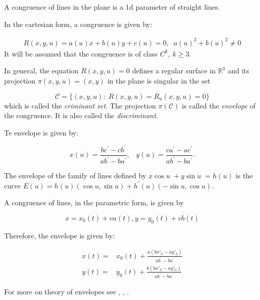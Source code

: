 

\begin{definition}
A congruence of lines in the plane is a 1d parameter of straight lines.
\end{definition}

 
   In the cartesian form, a congruence is given by:
 

\begin{align}  R(x,y,u)=a(u)x+b(u)y+c(u)=0,\;\; a(u)^2+b(u)^2\ne  0
\label{eq:appB-cr}
\end{align}
It will be assumed that the congruence is of class  $C^k,\, k\geq 3$. 

In general, the equation   $R(x,y,u)=0$ defines a regular surface in   $\mathbb{R}^3$  and its projection   $\pi(x,y,u)=(x,y)$ in the plane is singular in the set  

  \[\mathcal{C}= \{(x,y,u): \; R(x,y,u)=  R_u(x,y,u) =0 \} \]
  which is called the   \textit{criminant set}.
  The projection $\pi(\mathcal{C})$ is called the \textit{envelope} of the congruence. It is also called the     \textit{  discriminant.}

Te envelope is given by:

\begin{equation}\label{eq:env}
x(u)=\frac{b c^\prime-c b^\prime}{a b^\prime-b a^\prime},\;\;\; y(u)=\frac{c a^\prime-a c^\prime}{a b^\prime-b a^\prime}.
\end{equation}

 

\begin{example}  The envelope of the family of lines defined by   $x \cos u\;  +y\sin u \;  =h(u)$ is the curve
	$E(u)=h(u)(\cos u,\sin u)	+h^\prime(u)(-\sin u, \cos u). $
\end{example}

 
A congruence of lines, in the parametric form, is given by
 
\[ x=x_0(t)+v a(t), y=y_0(t)+v b(t)\]

Therefore, the envelope is given by:
 
	
	\begin{align*}
  x(t)=&x_0(t)+\frac{   a( b x'_0-a y'_0)}{a b^\prime-b a^\prime} \\
	y(t)=&y_0(t)+ \frac{   b( b x'_0-a y'_0)}{a b^\prime-b a^\prime} 	\end{align*}
 

 
  For more on theory of envelopes see  \cite[Chapter  3]{arnold-1994},  \cite[pp. 305]{berger-1992}, \cite[Chapter   5]{bruce-1992}. %
 

 

